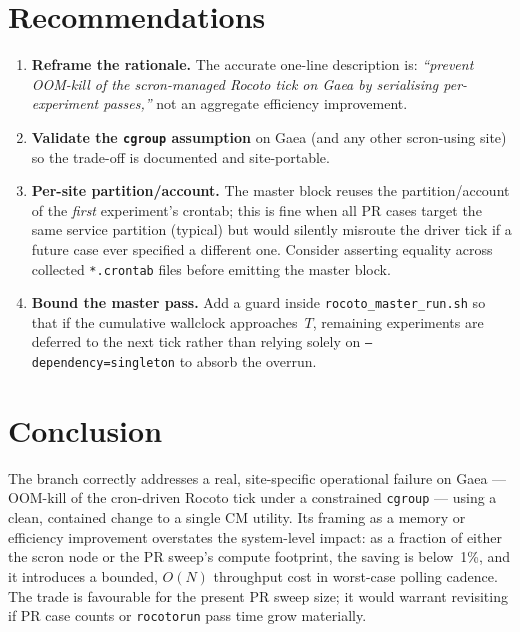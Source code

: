 \documentclass[11pt]{article}
\newcommand{\code}[1]{\texttt{#1}}
\begin{document}
\section{Recommendations}
\label{sec:recommendations}

\begin{enumerate}[leftmargin=*]
  \item \textbf{Reframe the rationale.} The accurate one-line
        description is: \emph{``prevent OOM-kill of the
        scron-managed Rocoto tick on Gaea by serialising per-experiment
        passes,''} not an aggregate efficiency improvement.
  \item \textbf{Validate the \code{cgroup} assumption} on Gaea (and any
        other scron-using site) so the trade-off is documented and
        site-portable.
  \item \textbf{Per-site partition/account.} The master block reuses
        the partition/account of the \emph{first} experiment's
        crontab; this is fine when all PR cases target the same
        service partition (typical) but would silently misroute the
        driver tick if a future case ever specified a different one.
        Consider asserting equality across collected
        \code{*.crontab} files before emitting the master block.
  \item \textbf{Bound the master pass.} Add a guard inside
        \code{rocoto\_master\_run.sh} so that if the cumulative
        wallclock approaches~$T$, remaining experiments are deferred
        to the next tick rather than relying solely on
        \code{--dependency=singleton} to absorb the overrun.
\end{enumerate}

\section{Conclusion}
\label{sec:conclusion}

The branch correctly addresses a real, site-specific operational
failure on Gaea --- OOM-kill of the cron-driven Rocoto tick under a
constrained \code{cgroup} --- using a clean, contained change to a
single CM utility. Its framing as a memory or efficiency improvement
overstates the system-level impact: as a fraction of either the scron
node or the PR sweep's compute footprint, the saving is below~1\%,
and it introduces a bounded, $O(N)$ throughput cost in worst-case
polling cadence. The trade is favourable for the present PR sweep
size; it would warrant revisiting if PR case counts or
\code{rocotorun} pass time grow materially.
\end{document}
